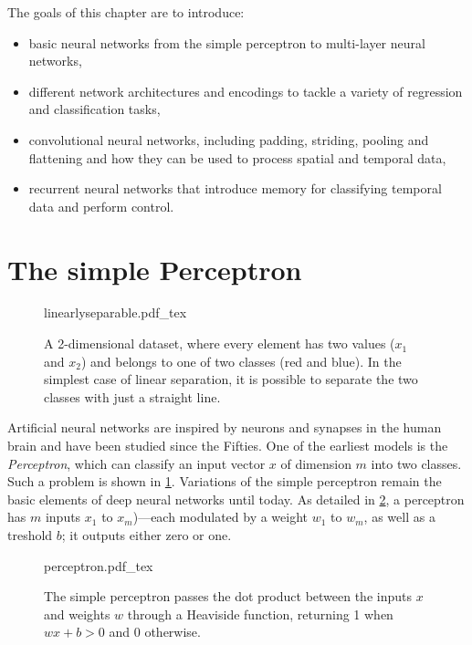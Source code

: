 The goals of this chapter are to introduce:


\begin{itemize}
    \item basic neural networks from the simple perceptron to multi-layer neural networks,
    \item different network architectures and encodings to tackle a variety of regression and classification tasks,
   \item convolutional neural networks, including padding, striding, pooling and flattening and how they can be used to process spatial and temporal data,
    \item recurrent neural networks that introduce memory for classifying temporal data and perform control. 
\end{itemize}


\section{The simple Perceptron}

\begin{figure}[!b]
    \centering
    \def\svgwidth{0.6\textwidth}
    {linearlyseparable.pdf_tex}
    \caption{A 2-dimensional dataset, where every element has two values ($x_1$ and $x_2$) and belongs to one of two classes (red and blue). In the simplest case of linear separation, it is possible to separate the two classes with just a straight line.\label{fig:linearsep}}
\end{figure}

Artificial neural networks are inspired by neurons and synapses in the human brain and have been studied since the Fifties. One of the earliest models is the \textsl{Perceptron}, which can classify an input vector $x$ of dimension $m$ into two classes. Such a problem is shown in \cref{fig:linearsep}. Variations of the simple perceptron remain the basic elements of deep neural networks until today.
%
As detailed in \cref{fig:perceptron}, a perceptron has $m$ inputs $x_1$ to $x_m$)---each modulated by a weight $w_1$ to $w_m$, as well as a treshold $b$; it outputs either zero or one.

\begin{figure}
    \centering
    \def\svgwidth{0.66\textwidth}
    {perceptron.pdf_tex}
    \caption{The simple perceptron passes the dot product between the inputs $x$ and weights $w$ through a Heaviside function, returning 1 when $wx+b>0$ and 0 otherwise.}\label{fig:perceptron}
\end{figure}

